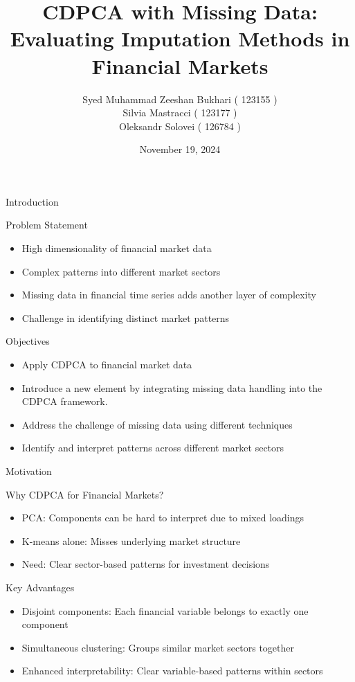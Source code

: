 \documentclass{beamer}
\title{CDPCA with Missing Data: Evaluating Imputation Methods in Financial Markets}
\author[123155/123177/126784]{Syed Muhammad Zeeshan Bukhari ( 123155 )\\
Silvia Mastracci ( 123177 )\\
Oleksandr Solovei ( 126784 )
}
\date{November 19, 2024}
\begin{document}
\begin{frame}
    \titlepage
\end{frame}

\begin{frame}{Introduction}
    \begin{block}{Problem Statement}
        \begin{itemize}
            \item High dimensionality of financial market data
            \item Complex patterns into different market sectors
            \item Missing data in financial time series adds another layer of complexity
            \item Challenge in identifying distinct market patterns
        \end{itemize}
    \end{block}

    \begin{block}{Objectives}
        \begin{itemize}
            \item Apply CDPCA to financial market data
            \item Introduce a new element by integrating missing data handling into the CDPCA framework.
            \item Address the challenge of missing data using different techniques
            \item Identify and interpret patterns across different market sectors
        \end{itemize}
    \end{block}
\end{frame}

\begin{frame}{Motivation}
    \begin{block}{Why CDPCA for Financial Markets?}
        \begin{itemize}
            \item PCA: Components can be hard to interpret due to mixed loadings
            \item K-means alone: Misses underlying market structure
            \item Need: Clear sector-based patterns for investment decisions
        \end{itemize}
    \end{block}

    \begin{block}{Key Advantages}
        \begin{itemize}
            \item Disjoint components: Each financial variable belongs to exactly one component
            \item Simultaneous clustering: Groups similar market sectors together
            \item Enhanced interpretability: Clear variable-based patterns within sectors
        \end{itemize}
    \end{block}
\end{frame}
\end{document}

